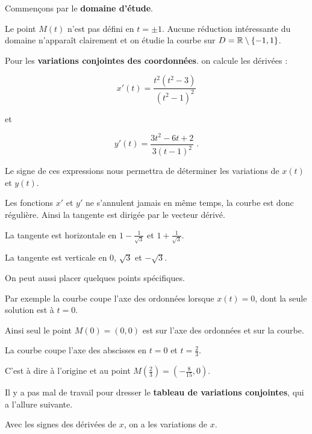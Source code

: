  Commençons par le \textbf{domaine d'étude}.  
  
\change

Le point $M(t)$ n'est pas défini en $t = \pm1$. 
Aucune réduction intéressante
du domaine n'apparaît clairement et on étudie la courbe
sur $D=\mathbb{R}\setminus\{-1,1\}$.



\change

Pour les \textbf{variations conjointes des coordonnées}. 
on calcule les dérivées :

\change
$$x'(t)=\frac{t^2(t^2-3)}{(t^2-1)^2}$$ 

et 

$$y'(t)=\frac{3t^2-6t+2}{3(t-1)^2}\; .$$

Le signe de ces expressions nous permettra de déterminer
les variations de $x(t)$ et $y(t)$.

\change

Les fonctions $x'$ et $y'$ ne s'annulent jamais en même temps,
la courbe est donc régulière. Ainsi la tangente est dirigée par le vecteur dérivé.

\change

La tangente est horizontale en $1-\frac{1}{\sqrt{3}}$ et $1+\frac{1}{\sqrt{3}}$.

\change

La tangente est verticale en $0$, $\sqrt{3}$ et $-\sqrt{3}$.

\change  

On peut aussi placer quelques points spécifiques.

\change 
Par exemple la courbe coupe l'axe des ordonnées lorsque 
$x(t)=0$, dont la seule solution est à $t=0$. 

\change
Ainsi seul le point $M(0)=(0,0)$ est sur l'axe des ordonnées et sur la courbe.

\change

La courbe coupe l'axe des abscisses en $t=0$ et $t=\frac{2}{3}$.


\change
C'est à dire à l'origine et au point $M(\frac{2}{3})=(-\frac{8}{15},0)$.





\diapo

Il y a pas mal de travail pour dresser le 
\textbf{tableau de variations conjointes}, 
qui a l'allure suivante.



Avec les signes des dérivées de $x$, on a les variations de $x$.

